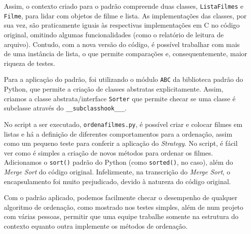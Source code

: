 \documentclass[a4paper]{article}
\begin{document}
	Assim, o contexto criado para o padrão compreende duas classes, \texttt{ListaFilmes} e \texttt{Filme}, para lidar com objetos de filme e lista. As implementações das classes, por sua vez, são praticamente iguais às respectivas implementações em C no código original, omitindo algumas funcionalidades (como o relatório de leitura de arquivo). Contudo, com a nova versão do código, é possível trabalhar com mais de uma instância de lista, o que permite comparações e, consequentemente, maior riqueza de testes.

	Para a aplicação do padrão, foi utilizando o módulo \texttt{ABC} da biblioteca padrão do Python, que permite a criação de classes abstratas explicitamente. Assim, criamos a classe abstrata/interface \texttt{Sorter} que permite checar se uma classe é subclasse através do \texttt{__subclasshook___}.

	No script a ser executado, \texttt{ordenafilmes.py}, é possível criar e colocar filmes em listas e há a definição de diferentes comportamentos para a ordenação, assim como um pequeno teste para conferir a aplicação do \emph{Strategy}. No script, é fácil ver como é simples a criação de novos métodos para ordenar os filmes. Adicionamos o \texttt{sort()} padrão do Python (como \texttt{sorted()}, no caso), além do \emph{Merge Sort} do código original. Infelizmente, na transcrição do \emph{Merge Sort}, o encapsulamento foi muito prejudicado, devido à natureza do código original. 

	Com o padrão aplicado, podemos facilmente checar o desempenho de qualquer algoritmo de ordenação, como mostrado nos testes simples, além de num projeto com várias pessoas, permitir que uma equipe trabalhe somente na estrutura do contexto equanto outra implemente os métodos de ordenação.
\end{document}
